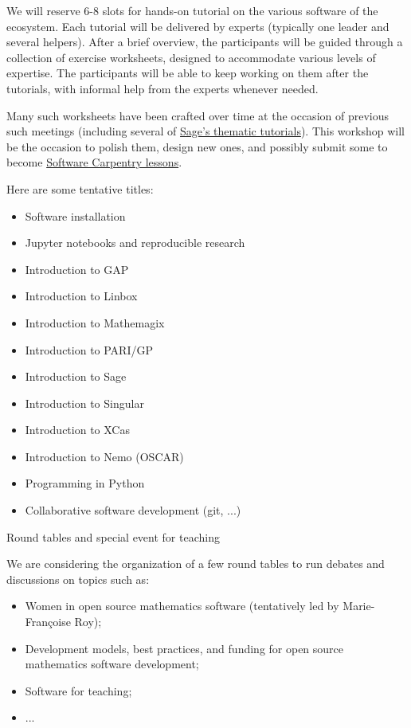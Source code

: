 \documentclass[12pt]{amsart}
\makeatletter
\def\subsection{\@startsection{subsection}{2}%
  \z@{.3\linespacing\@plus.5\linespacing}{.1\linespacing}%
  {\normalfont\bfseries}}
\makeatother
\begin{document}
We will reserve 6-8 slots for hands-on tutorial on the various
software of the ecosystem. Each tutorial will be delivered by experts
(typically one leader and several helpers). After a brief overview,
the participants will be guided through a collection of exercise
worksheets, designed to accommodate various levels of expertise.  The
participants will be able to keep working on them after the tutorials,
with informal help from the experts whenever needed.

Many such worksheets have been crafted over time at the occasion of
previous such meetings (including several of
\href{http://doc.sagemath.org/html/en/thematic_tutorials/}{Sage's
  thematic tutorials}). This workshop will be the occasion to polish them,
design new ones, and possibly submit some to become
\href{http://software-carpentry.org/lessons/}{Software Carpentry lessons}.

Here are some tentative titles:
\begin{itemize}
\item Software installation
\item Jupyter notebooks and reproducible research
\item Introduction to GAP
\item Introduction to Linbox
\item Introduction to Mathemagix
\item Introduction to PARI/GP
\item Introduction to Sage
\item Introduction to Singular
\item Introduction to XCas
\item Introduction to Nemo (OSCAR)
\item Programming in Python
\item Collaborative software development (git, ...)
\end{itemize}

\subsection{Round tables and special event for teaching}

We are considering the organization of a few round tables to run
debates and discussions on topics such as:

\begin{itemize}
\item Women in open source mathematics software (tentatively led by
  Marie-Françoise Roy);
\item Development models, best practices, and funding for open source
  mathematics software development;
\item Software for teaching;
\item ...
\end{itemize}
\end{document}
